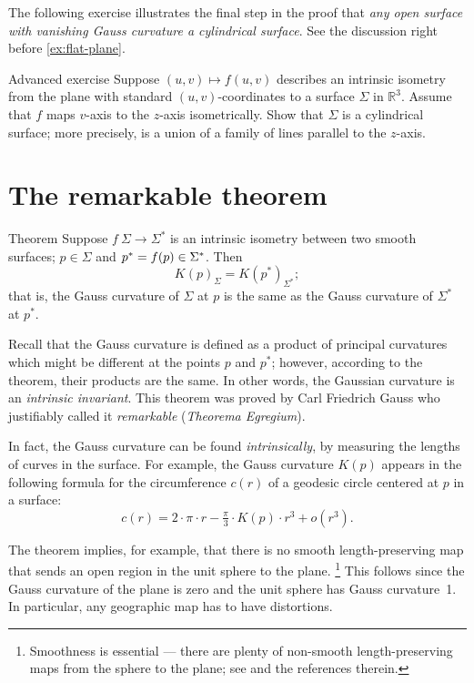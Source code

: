 The following exercise illustrates the final step in the proof that \textit{any open surface with vanishing Gauss curvature a cylindrical surface}.
See the discussion right before \ref{ex:flat-plane}.

\begin{thm}{Advanced exercise}\label{ex:line-cylinder} 
Suppose $(u,v)\mapsto f(u,v)$ describes an intrinsic isometry from the plane with standard $(u,v)$-coordinates to a surface $\Sigma$ in $\mathbb{R}^3$.
Assume that $f$ maps $v$-axis to the $z$-axis isometrically.
Show that $\Sigma$ is a cylindrical surface;
more precisely, is a union of a family of lines parallel to the $z$-axis.
\end{thm}


\section{The remarkable theorem}


\begin{thm}{Theorem}\label{thm:remarkable}
Suppose $f\:\Sigma\to \Sigma^{*}$ is an intrinsic isometry between two smooth surfaces; $p\in \Sigma$ and $p^{*}\z=f(p)\in \Sigma^{*}$.
Then 
\[K(p)_{\Sigma}=K(p^{*})_{\Sigma^{*}};\]
that is, the Gauss curvature of $\Sigma$ at $p$ is the same as the Gauss curvature of $\Sigma^{*}$ at $p^{*}$.
\end{thm}

Recall that the Gauss curvature is defined as a product of principal curvatures which might be different at the points $p$ and $p^*$; however, according to the theorem, their products are the same.
In other words, the Gaussian curvature is an \textit{intrinsic invariant}.
This theorem was proved by Carl Friedrich Gauss \cite{gauss} who justifiably called it {}\emph{remarkable} ({}\emph{Theorema Egregium}).

In fact, the Gauss curvature can be found \textit{intrinsically},
by measuring the lengths of curves in the surface.
For example, the Gauss curvature $K(p)$ appears in the following formula for the circumference $c(r)$ of a geodesic circle centered at $p$ in a surface: 
\[c(r)=2\cdot\pi\cdot r-\tfrac\pi3\cdot K(p)\cdot r^3+o(r^3).\]

The theorem implies, for example, that there is no smooth length-preserving map that sends an open region in the unit sphere to the plane.%
\footnote{Smoothness is essential --- there are plenty of non-smooth length-preserving maps from the sphere to the plane; see \cite{petrunin-yashinski} and the references therein.}
This follows since the Gauss curvature of the plane is zero and the unit sphere has Gauss curvature~1. 
In particular, any geographic map has to have distortions.

